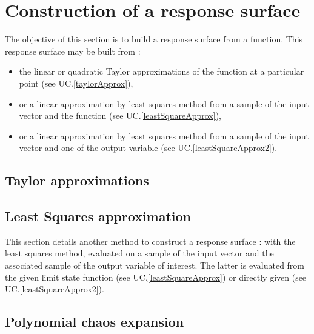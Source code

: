 \newpage \section{Construction of a response surface}



The objective of this section  is to build a response surface from a function. This response surface may be built from :
\begin{itemize}
\item the linear or quadratic Taylor approximations of the function at a particular point (see UC.\ref{taylorApprox}),
\item or a linear approximation by least squares method from a sample of the input vector and the function (see UC.\ref{leastSquareApprox}),
\item or a linear approximation by least squares method from a sample of the input vector and one of the output variable (see UC.\ref{leastSquareApprox2}).
\end{itemize}



\subsection{Taylor approximations}





\newpage \subsection{Least Squares approximation}

This section details another method to construct a response surface : with the least squares method, evaluated on a sample of the input vector and the associated sample of the output variable of interest. The latter is evaluated from the given limit state function (see UC.\ref{leastSquareApprox}) or directly given (see UC.\ref{leastSquareApprox2}).


\newpage 





\newpage \subsection{Polynomial chaos expansion}\label{polynomialchaosexpansion}

